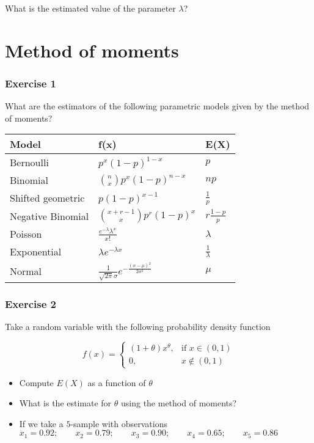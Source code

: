 \documentclass[
]{book}
\providecommand{\tightlist}{%
  \setlength{\itemsep}{0pt}\setlength{\parskip}{0pt}}
\begin{document}
What is the estimated value of the parameter \(\lambda\)?

\hypertarget{method-of-moments}{%
\section{Method of moments}\label{method-of-moments}}

\hypertarget{exercise-1-8}{%
\subsubsection{Exercise 1}\label{exercise-1-8}}

What are the estimators of the following parametric models given by the method of moments?

\begin{longtable}[]{@{}lll@{}}
\toprule
Model & f(x) & E(X) \\
\midrule
\endhead
Bernoulli & \(p^x(1-p)^{1-x}\) & \(p\) \\
Binomial & \(\binom n x p^x(1-p)^{n-x}\) & \(np\) \\
Shifted geometric & \(p(1-p)^{x-1}\) & \(\frac{1}{p}\) \\
Negative Binomial & \(\binom {x+r-1} x p^r(1-p)^x\) & \(r\frac{1-p}{p}\) \\
Poisson & \(\frac{e^{-\lambda}\lambda^x}{x!}\) & \(\lambda\) \\
Exponential & \(\lambda e^{-\lambda x}\) & \(\frac{1}{\lambda}\) \\
Normal & \(\frac{1}{\sqrt{2\pi}\sigma}e^{-\frac{(x-\mu)^2}{2\sigma^2}}\) & \(\mu\) \\
\bottomrule
\end{longtable}

\hypertarget{exercise-2-8}{%
\subsubsection{Exercise 2}\label{exercise-2-8}}

Take a random variable with the following probability density function

\[
f(x)=
\begin{cases}
    (1+\theta)x^\theta,& \text{if } x\in (0,1)\\
    0,& x\notin (0,1)
\end{cases}
\]

\begin{itemize}
\tightlist
\item
  Compute \(E(X)\) as a function of \(\theta\)
\item
  What is the estimate for \(\theta\) using the method of moments?
\item
  If we take a \(5\)-sample with observations
  \(x_1 = 0.92; \qquad x_2 = 0.79; \qquad x_3 = 0.90; \qquad x_4 = 0.65; \qquad x_5 = 0.86\)
\end{itemize}
\end{document}
